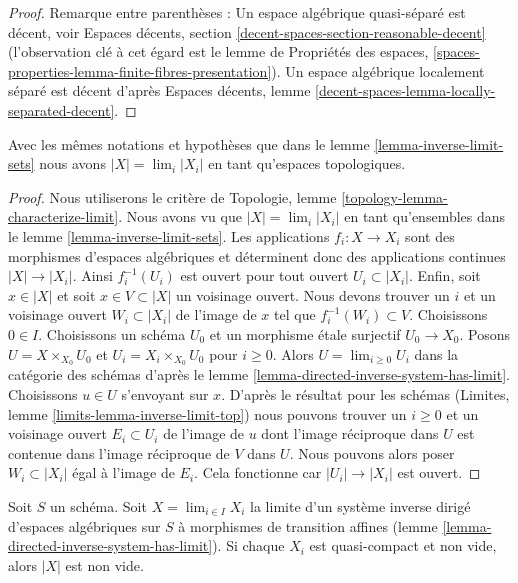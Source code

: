 \begin{proof}
\medskip\noindent
Remarque entre parenthèses : Un espace algébrique quasi-séparé est décent, voir
Espaces décents, section \ref{decent-spaces-section-reasonable-decent}
(l'observation clé à cet égard est le lemme de Propriétés des espaces,
\ref{spaces-properties-lemma-finite-fibres-presentation}).
Un espace algébrique localement séparé est décent d'après
Espaces décents, lemme \ref{decent-spaces-lemma-locally-separated-decent}.
\end{proof}

\begin{lemma}
\label{lemma-topology-limit}
Avec les mêmes notations et hypothèses que dans le lemme \ref{lemma-inverse-limit-sets}
nous avons $|X| = \lim_i |X_i|$ en tant qu'espaces topologiques.
\end{lemma}

\begin{proof}
Nous utiliserons le critère de
Topologie, lemme \ref{topology-lemma-characterize-limit}.
Nous avons vu que $|X| = \lim_i |X_i|$ en tant qu'ensembles dans
le lemme \ref{lemma-inverse-limit-sets}.
Les applications $f_i : X \to X_i$ sont des morphismes d'espaces algébriques
et déterminent donc des applications continues $|X| \to |X_i|$.
Ainsi $f_i^{-1}(U_i)$ est ouvert pour tout
ouvert $U_i \subset |X_i|$. Enfin,
soit $x \in |X|$ et soit $x \in V \subset |X|$ un voisinage ouvert.
Nous devons trouver un $i$ et un voisinage ouvert
$W_i \subset |X_i|$ de l'image de $x$
tel que $f_i^{-1}(W_i) \subset V$.
Choisissons $0 \in I$. Choisissons un schéma $U_0$ et un morphisme
\'etale surjectif $U_0 \to X_0$. Posons $U = X \times_{X_0} U_0$
et $U_i = X_i \times_{X_0} U_0$ pour $i \geq 0$.
Alors $U = \lim_{i \geq 0} U_i$ dans la catégorie des schémas d'après
le lemme \ref{lemma-directed-inverse-system-has-limit}.
Choisissons $u \in U$ s'envoyant sur $x$. D'après le résultat pour les schémas
(Limites, lemme \ref{limits-lemma-inverse-limit-top})
nous pouvons trouver un $i \geq 0$ et un voisinage ouvert
$E_i \subset U_i$ de l'image de $u$
dont l'image réciproque dans $U$ est contenue dans
l'image réciproque de $V$ dans $U$. Nous pouvons alors poser $W_i \subset |X_i|$
égal à l'image de $E_i$. Cela fonctionne car $|U_i| \to |X_i|$ est ouvert.
\end{proof}

\begin{lemma}
\label{lemma-limit-nonempty}
Soit $S$ un schéma. Soit $X = \lim_{i \in I} X_i$ la limite d'un système
inverse dirigé d'espaces algébriques sur $S$ à morphismes de transition affines
(lemme \ref{lemma-directed-inverse-system-has-limit}). Si chaque $X_i$
est quasi-compact et non vide, alors $|X|$ est non vide.
\end{lemma}

